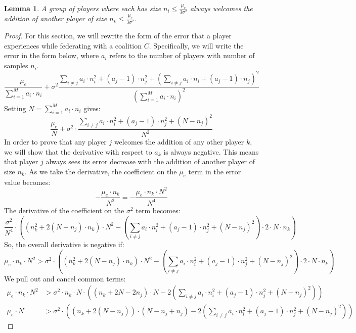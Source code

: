 \documentclass{article}
\newcommand{\p}[1]{\left( #1 \right)}
\newcommand{\cd}[0]{\cdot}
\newtheorem{lemma}{Lemma}
\newcommand{\nplayer}[0]{\ensuremath{M}}
\newcommand{\mue}[0]{\ensuremath{\mu_e}}
\newcommand{\var}[0]{\ensuremath{\sigma^2}}
\newcommand{\ndraw}[0]{\ensuremath{n}}
\newcommand{\total}[0]{\ensuremath{N}}
\newcommand{\col}[0]{\ensuremath{C}}
\begin{document}
\begin{lemma}\label{lem:welcome}
A group of players where each has size $\ndraw_i\leq \frac{\mue}{3\var}$ always welcomes the addition of another player of size $\ndraw_k \leq \frac{\mue}{3\var}$.  
\end{lemma}
\begin{proof}
For this section, we will rewrite the form of the error that a player experiences while federating with a coalition $\col$. Specifically, we will write the error in the form below, where $a_i$ refers to the number of players with number of samples $\ndraw_i$. 
$$\frac{\mue}{\sum_{i=1}^{\nplayer}a_i \cd \ndraw_i} + \var \frac{\sum_{i\ne j}a_i \cd \ndraw_i^2 + (a_j-1) \cd \ndraw_j^2 + (\sum_{i\ne j} a_i \cd \ndraw_i + (a_j-1) \cd \ndraw_j)^2}{(\sum_{i=1}^{\nplayer}a_i \cd \ndraw_i)^2}$$
Setting $\total = \sum_{i=1}^{\nplayer}a_i \cd \ndraw_i$ gives: 
$$\frac{\mue}{\total} + \var \cd \frac{\sum_{i\ne j}a_i \cd \ndraw_i^2 + (a_j-1) \cd \ndraw_j^2 + (\total - \ndraw_j)^2}{\total^2}$$
In order to prove that any player $j$ welcomes the addition of any other player $k$, we will show that the derivative with respect to $a_k$ is always negative. This means that player $j$ always sees its error decrease with the addition of another player of size $\ndraw_k$. 
As we take the derivative, the coefficient on the $\mue$  term in the error value becomes: 
$$-\frac{\mue \cd \ndraw_k}{\total^2} = -\frac{\mue \cd \ndraw_k \cd \total^2}{\total^4}$$
The derivative of the coefficient on the $\var$ term becomes: 
$$\frac{\var}{\total^4} \cd \p{ \p{\ndraw_k^2 + 2 (\total - \ndraw_j) \cd \ndraw_k} \cd \total^2 - \p{\sum_{i\ne j} a_i \cd \ndraw_i^2 + (a_j - 1) \cd \ndraw_j^2 + (\total - \ndraw_j)^2} \cd 2 \cd \total \cd \ndraw_k}$$
So, the overall derivative is negative if: 
$$\mue \cd \ndraw_k \cd \total^2 > \var \cd \p{ \p{\ndraw_k^2 + 2 (\total - \ndraw_j) \cd \ndraw_k} \cd \total^2 - \p{\sum_{i\ne j} a_i \cd \ndraw_i^2 + (a_j - 1) \cd \ndraw_j^2 + (\total - \ndraw_j)^2} \cd 2 \cd \total \cd \ndraw_k}$$
We pull out and cancel common terms: 
\begin{align*}
\mue \cd \ndraw_k \cd \total^2 &> \var \cd \ndraw_k \cd \total \cd \p{\p{\ndraw_k + 2 \total - 2 \ndraw_j} \cd \total - 2\p{\sum_{i\ne j} a_i \cd \ndraw_i^2 + (a_j - 1) \cd \ndraw_j^2 + (\total - \ndraw_j)^2}}\\
\mue \cd \total & > \var \cd \p{\p{\ndraw_k + 2 (\total - \ndraw_j)} \cd (\total-\ndraw_j + \ndraw_j) - 2\p{\sum_{i\ne j} a_i \cd \ndraw_i^2 + (a_j - 1) \cd \ndraw_j^2 + (\total - \ndraw_j)^2}}
\end{align*}

\end{proof}
\end{document}
